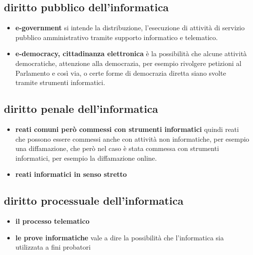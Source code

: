 \subsection{diritto pubblico dell'informatica}
\begin{itemize}
    \item \textbf{e-government} si intende la distribuzione, l'esecuzione di attività di servizio pubblico amministrativo tramite supporto informatico e telematico.
    \item \textbf{ e-democracy, cittadinanza elettronica} è la possibilità che alcune attività democratiche, attenzione alla democrazia, per esempio rivolgere petizioni al Parlamento e così via, o certe forme di democrazia diretta siano svolte tramite strumenti informatici. 
\end{itemize}

\subsection{diritto penale dell'informatica}
\begin{itemize}
    \item \textbf{reati comuni però commessi con strumenti informatici} quindi reati che possono essere commessi anche con attività non informatiche, per esempio una diffamazione, che però nel caso è stata commessa con strumenti informatici, per esempio la diffamazione online.
    \item \textbf{reati informatici in senso stretto}
\end{itemize}

\subsection{diritto processuale dell'informatica}
\begin{itemize}
    \item \textbf{il processo telematico}
    \item \textbf{le prove informatiche} vale a dire la possibilità che l'informatica sia utilizzata a fini probatori
\end{itemize}
